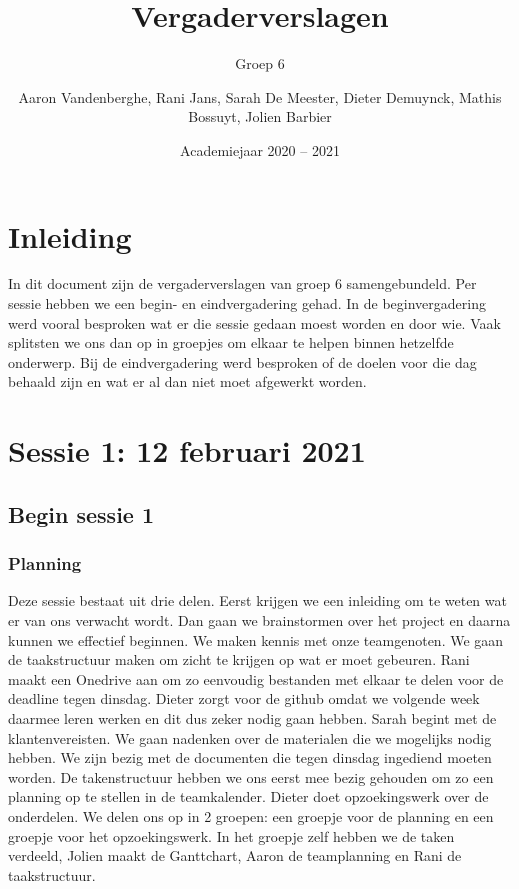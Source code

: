 \documentclass[a4paper,twoside,kulak]{kulakreport} %
\title{Vergaderverslagen}
\subtitle{Groep 6}
\author{Aaron Vandenberghe, Rani Jans, Sarah De Meester, Dieter Demuynck, Mathis Bossuyt, Jolien Barbier}
\institute{KU Leuven Kulak, Wetenschap \& Technologie}
\date{Academiejaar 2020 -- 2021}
\begin{document}
 

\titlepage

\tableofcontents

\chapter*{Inleiding}
In dit document zijn de vergaderverslagen van groep 6 samengebundeld. Per sessie hebben we een begin- en eindvergadering
gehad. In de beginvergadering werd vooral besproken wat er die sessie gedaan moest worden en door wie.  Vaak splitsten we ons dan op in groepjes om elkaar te helpen binnen hetzelfde onderwerp. Bij de eindvergadering werd besproken of de doelen voor die dag behaald zijn en wat er al dan niet moet afgewerkt worden. 

\chapter{Sessie 1: 12 februari 2021}
\section{Begin sessie 1}
\subsection{Planning}
Deze sessie  bestaat uit drie delen. Eerst krijgen we een inleiding om te weten wat er van ons verwacht wordt. Dan gaan we brainstormen over het project en daarna kunnen we effectief beginnen. We maken kennis met onze teamgenoten. We gaan de taakstructuur maken om zicht te krijgen op wat er moet gebeuren. Rani maakt een Onedrive aan om zo eenvoudig bestanden met elkaar te delen voor de deadline tegen dinsdag. Dieter zorgt voor de github omdat we volgende week daarmee leren werken en dit dus zeker nodig gaan hebben. %
Sarah begint met de klantenvereisten. We gaan nadenken over de materialen die we mogelijks nodig hebben. We zijn bezig met de documenten die tegen dinsdag ingediend moeten worden. De takenstructuur hebben we ons eerst mee bezig gehouden om zo een planning op te stellen in de teamkalender. %
Dieter doet opzoekingswerk over de onderdelen. We delen ons op in 2 groepen: een groepje voor de planning en een groepje voor het opzoekingswerk. In het groepje zelf hebben we de taken verdeeld, Jolien maakt de Ganttchart, Aaron de teamplanning en Rani de taakstructuur. 
\end{document}
